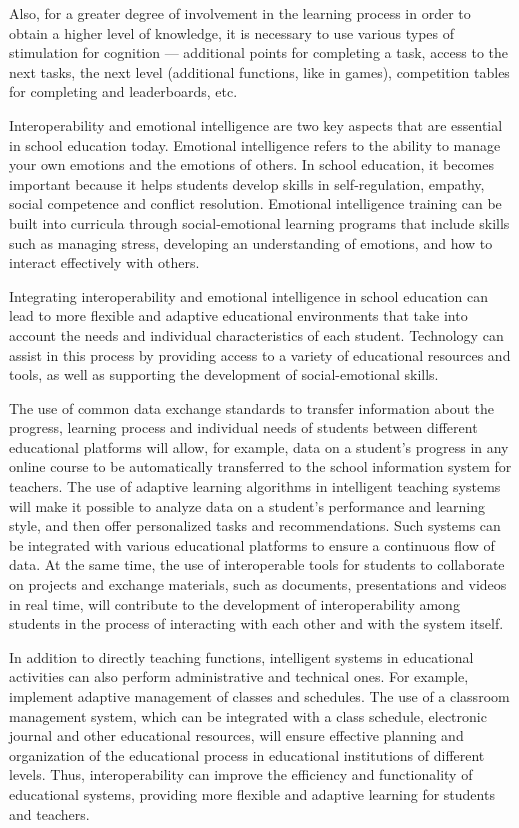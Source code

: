 \documentclass[10pt, a4paper]{article}
\begin{document}
\begin{multicols}{2}
        Also, for a greater degree of involvement in the learning process in order to obtain a higher level of knowledge, it is necessary to use various types of stimulation for cognition — additional points for completing a task, access to the next tasks, the next level (additional functions, like in games), competition tables for completing and leaderboards, etc.

        Interoperability and emotional intelligence are two key aspects that are essential in school education today. Emotional intelligence refers to the ability to manage your own emotions and the emotions of others. In school education, it becomes important because it helps students develop skills in self-regulation, empathy, social competence and conflict resolution. Emotional intelligence training can be built into curricula through social-emotional learning programs that include skills such as managing stress, developing an understanding of emotions, and how to interact effectively with others.

        Integrating interoperability and emotional intelligence in school education can lead to more flexible and adaptive educational environments that take into account the needs and individual characteristics of each student. Technology can assist in this process by providing access to a variety of educational resources and tools, as well as supporting the development of social-emotional skills.

        The use of common data exchange standards to transfer information about the progress, learning process and individual needs of students between different educational platforms will allow, for example, data on a student’s progress in any online course to be automatically transferred to the school information system for teachers. The use of adaptive learning algorithms in intelligent teaching systems will make it possible to analyze data on a student’s performance and learning style, and then offer personalized tasks and recommendations. Such systems can be integrated with various educational platforms to ensure a continuous flow of data. At the same time, the use of interoperable tools for students to collaborate on projects and exchange materials, such as documents, presentations and videos in real time, will contribute to the development of interoperability among students in the process of interacting with each other and with the system itself.

        In addition to directly teaching functions, intelligent systems in educational activities can also perform administrative and technical ones. For example, implement adaptive management of classes and schedules. The use of a classroom management system, which can be integrated with a class schedule, electronic journal and other educational resources, will ensure effective planning and organization of the educational process in educational institutions of different levels. Thus, interoperability can improve the efficiency and functionality of educational systems, providing more flexible and adaptive learning for students and teachers.


\end{multicols}
\end{document}
